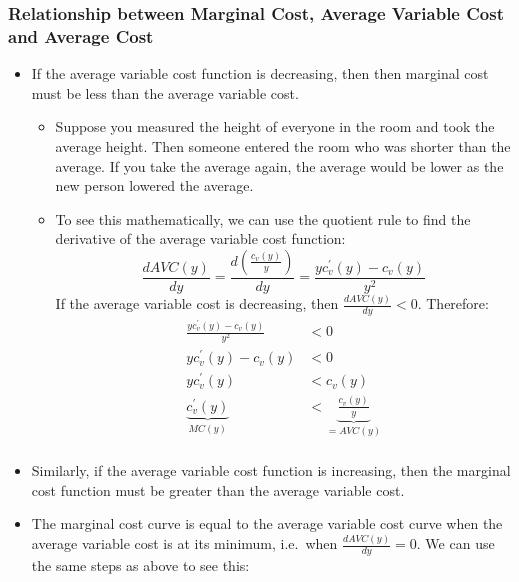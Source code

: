 \documentclass{article}
\begin{document}
\subsubsection*{Relationship between Marginal Cost, Average Variable Cost and Average Cost}
\begin{itemize}
  \item If the average variable cost function is decreasing, then then marginal cost must be less than the average variable cost.
    \begin{itemize}
      \item Suppose you measured the height of everyone in the room and took the average height. Then someone entered the room who was shorter than the average. If you take the average again, the average would be lower as the new person lowered the average.
      \item To see this mathematically, we can use the quotient rule to find the derivative of the average variable cost function:
        \begin{equation*}
          \frac{dAVC\left( y \right)}{dy}= \frac{d\left(\frac{c_v\left( y \right)}{y}  \right)}{dy} = \frac{yc_v^{\prime}\left( y \right)-c_v\left( y \right)}{y^2}
        \end{equation*}
        If the average variable cost is decreasing, then $\frac{dAVC\left( y \right)}{dy}<0$. Therefore:
        \begin{align*}
         \frac{yc_v^{\prime}\left( y \right)-c_v\left( y \right)}{y^2} &< 0\\
         yc_v^{\prime}\left( y \right)-c_v\left( y \right) &< 0\\
         yc_v^{\prime}\left( y \right)&< c_v\left( y \right)\\
         \underbrace{c_v^{\prime}\left( y \right)}_{MC\left( y \right)}&< \underbrace{\frac{c_v\left( y \right)}{y}}_{=AVC\left( y \right)}\\
        \end{align*}
    \end{itemize}
  \item Similarly, if the average variable cost function is increasing, then the marginal cost function must be greater than the average variable cost.
  \item The marginal cost curve is equal to the average variable cost curve when the average variable cost is at its minimum, i.e.~when $\frac{dAVC\left( y \right)}{dy}=0$. We can use the same steps as above to see this:
        \begin{align*}

\end{align*}
\end{itemize}
\end{document}

